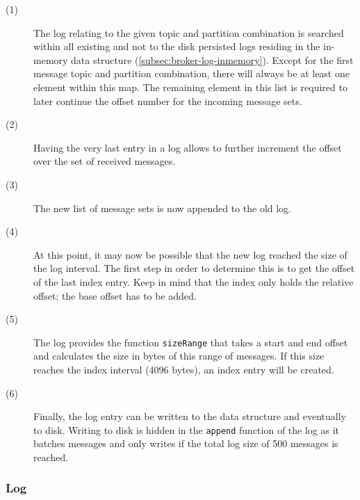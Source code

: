 \begin{description}
  \item[(1)]

    The log relating to the given topic and partition combination is 
    searched within all existing and not to the disk persisted logs residing
    in the in-memory data structure (\ref{subsec:broker-log-inmemory}). Except
    for the first message topic and partition combination, there will always be
    at least one element within this map. The remaining element in this list is
    required to later continue the offset number for the incoming
    message sets.

  \item[(2)]

    Having the very last entry in a log allows to further increment the offset
    over the set of received messages.

  \item[(3)]

    The new list of message sets is now appended to the old log.

  \item[(4)]

    At this point, it may now be possible that the new log reached the size of
    the log interval. The first step in order to determine this is to get the
    offset of the last index entry. Keep in mind that the index only holds the
    relative offset; the base offset has to be added.

  \item[(5)]

    The log provides the function \lstinline{sizeRange} that takes a start and
    end offset and calculates the size in bytes of this range of messages. If
    this size reaches the index interval (4096 bytes), an index entry will be
    created.

  \item[(6)]

    Finally, the log entry can be written to the data structure and eventually
    to disk. Writing to disk is hidden in the \lstinline{append} function of the
    log as it batches messages and only writes if the total log size of 500
    messages is reached.

\end{description}

\subsubsection{Log}


